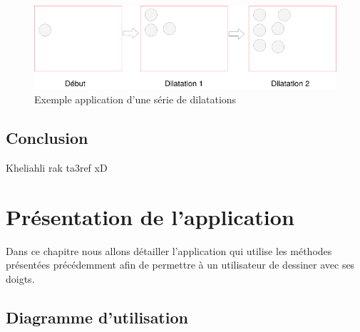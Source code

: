 \documentclass[12pt]{report}
\begin{document}
\begin{figure}[H]
	\centering
	\includegraphics[scale=0.75]{imgs/dilatations1.png}
	\caption{Exemple application d'une série de dilatations}
	\label{fig:Dilatations}
\end{figure}
\section{Conclusion}
Kheliahli rak ta3ref xD 


\chapter{Présentation de l'application}
Dans ce chapitre nous allons détailler l’application qui utilise les méthodes présentées précédemment afin de permettre à un utilisateur de dessiner avec ses doigts.
\section{Diagramme d'utilisation}
\end{document}
